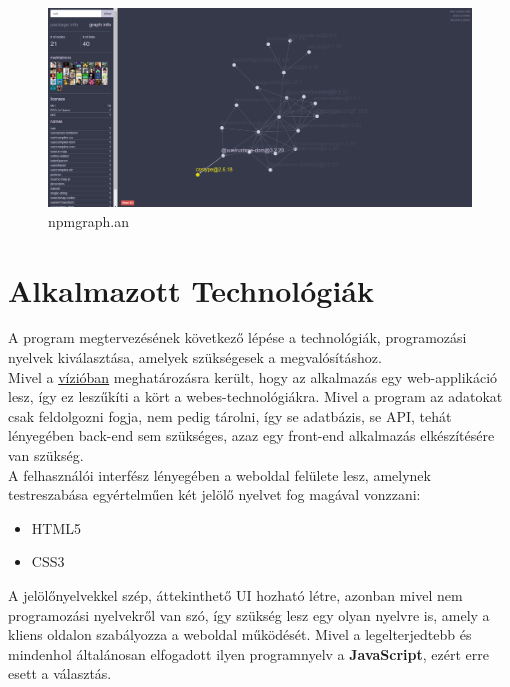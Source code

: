 	\begin{figure}[!h]
		\centering
		\includegraphics[scale=0.2]{images/anvaka_npmgraph.png}
		\caption{npmgraph.an}
		\label{fig:sw-npmgraph}
	\end{figure}
	
	\pagebreak

\section{Alkalmazott Technológiák}

A program megtervezésének következő lépése a technológiák, programozási nyelvek kiválasztása, amelyek szükségesek a megvalósításhoz.\\

Mivel a \hyperlink{section.2.2}{vízióban} meghatározásra került, hogy az alkalmazás egy web-applikáció lesz, így ez leszűkíti a kört a webes-technológiákra. Mivel a program az adatokat csak feldolgozni fogja, nem pedig tárolni, így se adatbázis, se API, tehát lényegében back-end sem szükséges, azaz egy front-end alkalmazás elkészítésére van szükség.\\

A felhasználói interfész lényegében a weboldal felülete lesz, amelynek testreszabása egyértelműen két jelölő nyelvet fog magával vonzzani:
\begin{itemize}
	\item HTML5
	\item CSS3
\end{itemize}

A jelölőnyelvekkel szép, áttekinthető UI hozható létre, azonban mivel nem programozási nyelvekről van szó, így szükség lesz egy olyan nyelvre is, amely a kliens oldalon szabályozza a weboldal működését. Mivel a legelterjedtebb és mindenhol általánosan elfogadott ilyen programnyelv a \textbf{JavaScript}, ezért erre esett a választás.\\

